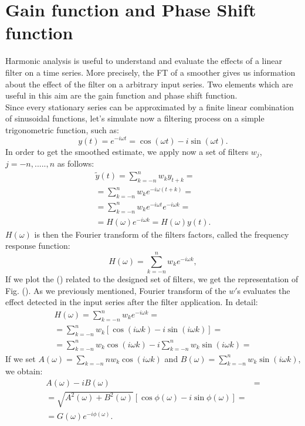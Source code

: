\documentclass{article}
\begin{document}
\section{Gain function and Phase Shift function}
Harmonic analysis is useful to understand and evaluate the effects of a linear filter on a time series. More precisely, the FT of a smoother gives us information about the effect of the filter on a arbitrary input series. Two elements which are useful in this aim are the gain function and phase shift function. \\Since every stationary series can be approximated by a finite linear combination of sinusoidal functions, let's simulate now a filtering process on a simple trigonometric function, such as:
\begin{equation}
y(t)=e^{-i\omega t}=\cos(\omega t)-i\sin(\omega t).
\end{equation}
In order to get the smoothed estimate,  we apply now a set of filters $w_j$, $j=-n,.....,n$ as follows:
\begin{align}
\tilde{y}(t)=\sum_{k=-n}^{n}w_k y_{t+k}=\\
=\sum_{k=-n}^{n} w_k e^{-i\omega (t+k)}=\\
=\sum_{k=-n}^{n} w_k e^{-i\omega t} e^{-i\omega k}=\\
=H(\omega)e^{-i\omega k}= H(\omega) y(t).
\end{align}
$H(\omega)$ is then the Fourier transform of the filters factors, called the frequency response function:
\begin{equation}
H(\omega)=\sum_{k=-n}^{n}w_k e^{-i\omega k},
\end{equation}
If we plot the () related to the designed set of filters, we get the representation of Fig. (). As we previously mentioned, Fourier transform of the $w'$s evaluates the effect detected in the input series after the filter application. In detail:
\begin{align}
H(\omega)=\sum_{k=-n}^{n} w_k e^{-i\omega k}=\\
=\sum_{k=-n}^{n} w_k [\cos(i\omega k)-i\sin(i\omega k)]=\\
=\sum_{k=-n}^{n} w_k \cos(i\omega k)-i\sum_{k=-n}^{n} w_k \sin(i\omega k)=
\end{align}
If we set $A(\omega)=\sum_{k=-n}{n}w_k\cos(i\omega k)$ and $B(\omega)=\sum_{k=-n}^{n}w_k\sin(i\omega k)$, we obtain:
\begin{align}
A(\omega)-i B(\omega) &=\\
=\sqrt{A^2(\omega)+B^2(\omega)}[\cos\phi(\omega)-i\sin\phi(\omega)]=\\
=G(\omega)e^{-i\phi(\omega)}.
\end{align}
\end{document}
